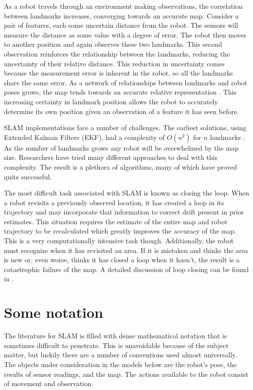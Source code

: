 \documentclass[12pt]{article}
\begin{document}
As a robot travels through an environment making observations, the correlation between landmarks increases, converging towards an accurate map.  Consider a pair of features, each some uncertain distance from the robot.  The sensors will measure the distance as some value with a degree of error.  The robot then moves to another position and again observes these two landmarks.  This second observation reinforces the relationship between the landmarks, reducing the uncertainty of their relative distance.  This reduction in uncertainty comes because the measurement error is inherent in the robot, so all the landmarks share the same error.  As a network of relationships between landmarks and robot poses grows, the map tends towards an accurate relative representation \cite{durrant2006simultaneous}.  This increasing certainty in landmark position allows the robot to accurately determine its own position given an observation of a feature it has seen before.

SLAM implementations face a number of challenges.  The earliest solutions, using Extended Kalman Filters (EKF), had a complexity of $O(n^2)$ for $n$ landmarks \cite{ThrunPR2005}.  As the number of landmarks grows any robot will be overwhelmed by the map size.  Researchers have tried many different approaches to deal with this complexity.  The result is a plethora of algorithms, many of which have proved quite successful.  

The most difficult task associated with SLAM is known as closing the loop.  When a robot revisits a previously observed location, it has created a loop in its trajectory and may incorporate that information to correct drift present in prior estimates.  This situation requires the estimate of the entire map and robot trajectory to be recalculated which greatly improves the accuracy of the map.  This is a very computationally intensive task though.  Additionally, the robot must recognize when it has revisited an area.  If it is mistaken and thinks the area is new or, even worse, thinks it has closed a loop when it hasn’t, the result is a catastrophic failure of the map.  A detailed discussion of loop closing can be found in \cite{LoopClosing}.

\section{Some notation}

The literature for SLAM is filled with dense mathematical notation that is sometimes difficult to penetrate.  This is unavoidable because of the subject matter, but luckily there are a number of conventions used almost universally.  The objects under consideration in the models below are the robot’s pose, the results of sensor readings, and the map.  The actions available to the robot consist of movement and observation.  
\end{document}
